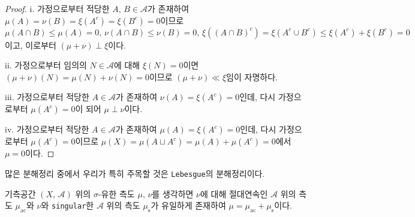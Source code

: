 \begin{proof}
    i. 가정으로부터 적당한 $A,\,B\in\mathcal{A}$가 존재하여 $\mu(A)=\nu(B)=\xi(A^c)=\xi(B^c)=0$이므로 $\mu(A\cap B)\leq\mu(A)=0,\,\nu(A\cap B)\leq\nu(B)=0,\,\xi((A\cap B)^c)=\xi(A^c\cup B^c)\leq\xi(A^c)+\xi(B^c)=0$이고, 이로부터 $(\mu+\nu)\perp\xi$이다.

    ii. 가정으로부터 임의의 $N\in\mathcal{A}$에 대해 $\xi(N)=0$이면 $(\mu+\nu)(N)=\mu(N)+\nu(N)=0$이므로 $(\mu+\nu)\ll\xi$임이 자명하다.

    iii. 가정으로부터 적당한 $A\in\mathcal{A}$가 존재하여 $\nu(A)=\xi(A^c)=0$인데, 다시 가정으로부터 $\mu(A^c)=0$이 되어 $\mu\perp\nu$이다.

    iv. 가정으로부터 적당한 $A\in\mathcal{A}$가 존재하여 $\mu(A)=\xi(A^c)=0$인데, 다시 가정으로부터 $\mu(A^c)=0$이므로 $\mu(X)=\mu(A\sqcup A^c)=\mu(A)+\mu(A^c)=0$에서 $\mu=0$이다.
\end{proof}

많은 분해정리 중에서 우리가 특히 주목할 것은 \texttt{Lebesgue}의 분해정리이다.

\begin{theorem}
    기측공간 $(X,\,\mathcal{A})$ 위의 $\sigma$-유한 측도 $\mu,\,\nu$를 생각하면 $\nu$에 대해 절대연속인 $\mathcal{A}$ 위의 측도 $\mu_\mathrm{ac}$와 $\nu$와 \texttt{singular}한 $\mathcal{A}$ 위의 측도 $\mu_\mathrm{s}$가 유일하게 존재하여 $\mu=\mu_\mathrm{ac}+\mu_\mathrm{s}$이다.
\end{theorem}

